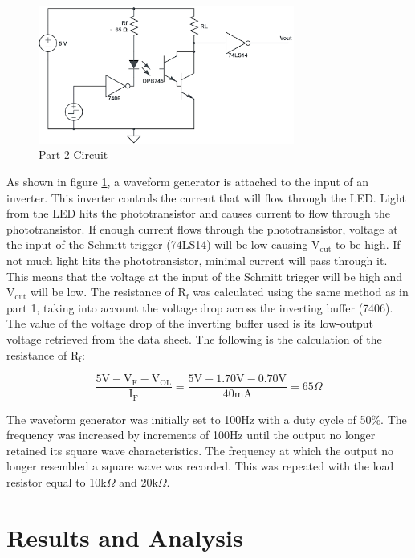 \documentclass[CMPE]{KGCOEReport}
\begin{document}
\begin{figure}[H]
    \centering
    \includegraphics[width=0.75\textwidth]{circuit_2.png}
    \caption{Part 2 Circuit}
    \label{fig:circuit2}
\end{figure}

As shown in figure \ref{fig:circuit2}, a waveform generator is attached to the input of an inverter. This inverter controls the current that will flow through the LED. Light from the LED hits the phototransistor and causes current to flow through the phototransistor. If enough current flows through the phototransistor, voltage at the input of the Schmitt trigger (74LS14) will be low causing V$_{\text{out}}$ to be high. If not much light hits the phototransistor, minimal current will pass through it. This means that the voltage at the input of the Schmitt trigger will be high and V$_{\text{out}}$ will be low. The resistance of R$_\text{f}$ was calculated using the same method as in part 1, taking into account the voltage drop across the inverting buffer (7406). The value of the voltage drop of the inverting buffer used is its low-output voltage retrieved from the data sheet. The following is the calculation of the resistance of R$_\text{f}$:

\[ \frac{5\text{V} - \text{V}_\text{F} - \text{V}_\text{OL}}{\text{I}_\text{F}} = \frac{5\text{V} - 1.70\text{V} - 0.70\text{V}}{40 \text{mA}} = 65 \Omega \]

The waveform generator was initially set to 100Hz with a duty cycle of 50\%. The frequency was increased by increments of 100Hz until the output no longer retained its square wave characteristics. The frequency at which the output no longer resembled a square wave was recorded. This was repeated with the load resistor equal to 10k$\Omega$ and 20k$\Omega$.

\section*{Results and Analysis}
\end{document}
